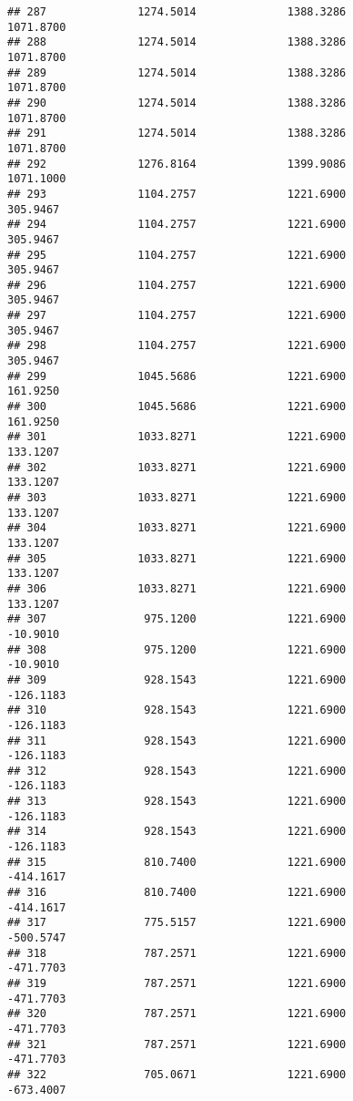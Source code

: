 \documentclass[]{article}
\begin{document}
\begin{verbatim}
## 287              1274.5014              1388.3286           1071.8700
## 288              1274.5014              1388.3286           1071.8700
## 289              1274.5014              1388.3286           1071.8700
## 290              1274.5014              1388.3286           1071.8700
## 291              1274.5014              1388.3286           1071.8700
## 292              1276.8164              1399.9086           1071.1000
## 293              1104.2757              1221.6900            305.9467
## 294              1104.2757              1221.6900            305.9467
## 295              1104.2757              1221.6900            305.9467
## 296              1104.2757              1221.6900            305.9467
## 297              1104.2757              1221.6900            305.9467
## 298              1104.2757              1221.6900            305.9467
## 299              1045.5686              1221.6900            161.9250
## 300              1045.5686              1221.6900            161.9250
## 301              1033.8271              1221.6900            133.1207
## 302              1033.8271              1221.6900            133.1207
## 303              1033.8271              1221.6900            133.1207
## 304              1033.8271              1221.6900            133.1207
## 305              1033.8271              1221.6900            133.1207
## 306              1033.8271              1221.6900            133.1207
## 307               975.1200              1221.6900            -10.9010
## 308               975.1200              1221.6900            -10.9010
## 309               928.1543              1221.6900           -126.1183
## 310               928.1543              1221.6900           -126.1183
## 311               928.1543              1221.6900           -126.1183
## 312               928.1543              1221.6900           -126.1183
## 313               928.1543              1221.6900           -126.1183
## 314               928.1543              1221.6900           -126.1183
## 315               810.7400              1221.6900           -414.1617
## 316               810.7400              1221.6900           -414.1617
## 317               775.5157              1221.6900           -500.5747
## 318               787.2571              1221.6900           -471.7703
## 319               787.2571              1221.6900           -471.7703
## 320               787.2571              1221.6900           -471.7703
## 321               787.2571              1221.6900           -471.7703
## 322               705.0671              1221.6900           -673.4007

\end{verbatim}
\end{document}
